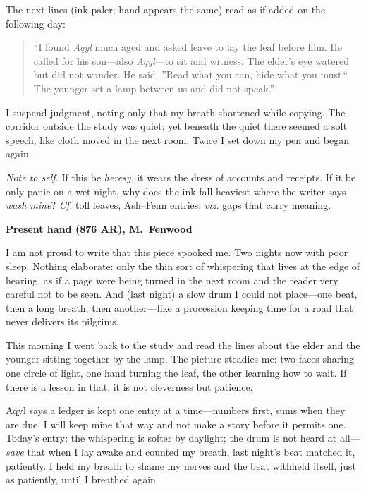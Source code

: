 \documentclass[11pt]{article}
\numberwithin{equation}{section} %
\theoremstyle{plain} %
\theoremstyle{definition} %
\theoremstyle{remark} %
\begin{document}
The next lines (ink paler; hand appears the same) read as if added on the following day:

\begin{quote}\small
``I found \textit{Aqyl} much aged and asked leave to lay the leaf before him. He called for his son---also \textit{Aqyl}---to sit and witness. The elder's eye watered but did not wander. He said, ''Read what you can, hide what you must.`` The younger set a lamp between us and did not speak.''
\end{quote}

I suspend judgment, noting only that my breath shortened while copying. The corridor outside the study was quiet; yet beneath the quiet there seemed a soft speech, like cloth moved in the next room. Twice I set down my pen and began again.

\medskip
\noindent\textit{Note to self.} If this be \emph{heresy}, it wears the dress of accounts and receipts. If it be only panic on a wet night, why does the ink fall heaviest where the writer says \emph{wash mine}? \emph{Cf.} toll leaves, Ash--Fenn entries; \emph{viz.} gaps that carry meaning.

\medskip
\noindent\textbf{Present hand (876 AR), M.\ Fenwood}

I am not proud to write that this piece spooked me. Two nights now with poor sleep. Nothing elaborate: only the thin sort of whispering that lives at the edge of hearing, as if a page were being turned in the next room and the reader very careful not to be seen. And (last night) a slow drum I could not place---one beat, then a long breath, then another---like a procession keeping time for a road that never delivers its pilgrims.

This morning I went back to the study and read the lines about the elder and the younger sitting together by the lamp. The picture steadies me: two faces sharing one circle of light, one hand turning the leaf, the other learning how to wait. If there is a lesson in that, it is not cleverness but patience.

Aqyl says a ledger is kept one entry at a time---numbers first, sums when they are due. I will keep mine that way and not make a story before it permits one. Today's entry: the whispering is softer by daylight; the drum is not heard at all---\emph{save} that when I lay awake and counted my breath, last night's beat matched it, patiently. I held my breath to shame my nerves and the beat withheld itself, just as patiently, until I breathed again.
\end{document}
